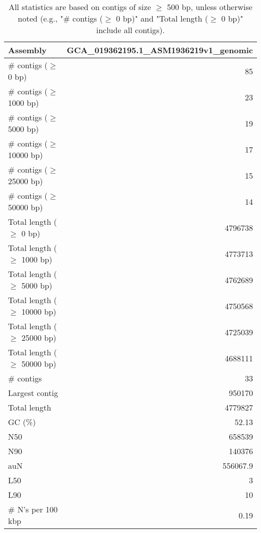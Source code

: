 \documentclass[12pt,a4paper]{article}
\begin{document}
\begin{table}[ht]
\begin{center}
\caption{All statistics are based on contigs of size $\geq$ 500 bp, unless otherwise noted (e.g., "\# contigs ($\geq$ 0 bp)" and "Total length ($\geq$ 0 bp)" include all contigs).}
\begin{tabular}{|l*{1}{|r}|}
\hline
Assembly & GCA\_019362195.1\_ASM1936219v1\_genomic \\ \hline
\# contigs ($\geq$ 0 bp) & 85 \\ \hline
\# contigs ($\geq$ 1000 bp) & 23 \\ \hline
\# contigs ($\geq$ 5000 bp) & 19 \\ \hline
\# contigs ($\geq$ 10000 bp) & 17 \\ \hline
\# contigs ($\geq$ 25000 bp) & 15 \\ \hline
\# contigs ($\geq$ 50000 bp) & 14 \\ \hline
Total length ($\geq$ 0 bp) & 4796738 \\ \hline
Total length ($\geq$ 1000 bp) & 4773713 \\ \hline
Total length ($\geq$ 5000 bp) & 4762689 \\ \hline
Total length ($\geq$ 10000 bp) & 4750568 \\ \hline
Total length ($\geq$ 25000 bp) & 4725039 \\ \hline
Total length ($\geq$ 50000 bp) & 4688111 \\ \hline
\# contigs & 33 \\ \hline
Largest contig & 950170 \\ \hline
Total length & 4779827 \\ \hline
GC (\%) & 52.13 \\ \hline
N50 & 658539 \\ \hline
N90 & 140376 \\ \hline
auN & 556067.9 \\ \hline
L50 & 3 \\ \hline
L90 & 10 \\ \hline
\# N's per 100 kbp & 0.19 \\ \hline
\end{tabular}
\end{center}
\end{table}
\end{document}

